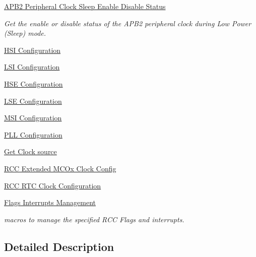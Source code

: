 \begin{DoxyCompactItemize}
\hyperlink{group___r_c_c___a_p_b2___clock___sleep___enable___disable___status}{A\-P\-B2 Peripheral Clock Sleep Enable Disable Status}
\begin{DoxyCompactList}\small\item\em Get the enable or disable status of the A\-P\-B2 peripheral clock during Low Power (Sleep) mode. \end{DoxyCompactList}\item 
\hyperlink{group___r_c_c___h_s_i___configuration}{H\-S\-I Configuration}
\item 
\hyperlink{group___r_c_c___l_s_i___configuration}{L\-S\-I Configuration}
\item 
\hyperlink{group___r_c_c___h_s_e___configuration}{H\-S\-E Configuration}
\item 
\hyperlink{group___r_c_c___l_s_e___configuration}{L\-S\-E Configuration}
\item 
\hyperlink{group___r_c_c___m_s_i___configuration}{M\-S\-I Configuration}
\item 
\hyperlink{group___r_c_c___p_l_l___configuration}{P\-L\-L Configuration}
\item 
\hyperlink{group___r_c_c___get___clock__source}{Get Clock source}
\item 
\hyperlink{group___r_c_c_ex___m_c_ox___clock___config}{R\-C\-C Extended M\-C\-Ox Clock Config}
\item 
\hyperlink{group___r_c_c___r_t_c___clock___configuration}{R\-C\-C R\-T\-C Clock Configuration}
\item 
\hyperlink{group___r_c_c___flags___interrupts___management}{Flags Interrupts Management}
\begin{DoxyCompactList}\small\item\em macros to manage the specified R\-C\-C Flags and interrupts. \end{DoxyCompactList}\end{DoxyCompactItemize}


\subsection{Detailed Description}
